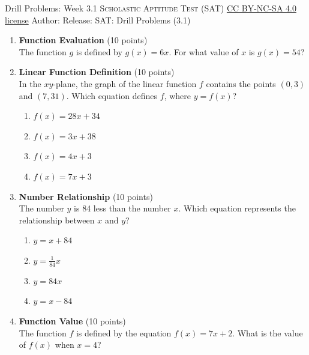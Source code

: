 \newpage\handout
{Drill Problems: Week 3.1}
{\textsc{Scholastic Aptitude Test (SAT)}}
{\href{https://creativecommons.org/licenses/by-nc-sa/4.0/}{CC BY-NC-SA 4.0 license}}
{Author: \BookAuthor}{Release: \generatedOn}
{SAT: Drill Problems (3.1)}


\begin{enumerate}
  \item \textbf{Function Evaluation} (10 points)\\
  The function $g$ is defined by $g(x)=6x$. For what value of $x$ is $g(x)=54$?
  \begin{subanswer}
  \end{subanswer}

  \item \textbf{Linear Function Definition} (10 points)\\
  In the $xy$-plane, the graph of the linear function $f$ contains the points $(0,3)$ and $(7,31)$. Which equation defines $f$, where $y=f(x)$?\\
  \begin{enumerate}[label=(\Alph*)]
    \item $f(x)=28x+34$
    \item $f(x)=3x+38$
    \item $f(x)=4x+3$
    \item $f(x)=7x+3$
  \end{enumerate}
  \begin{subanswer}
  \end{subanswer}

  \item \textbf{Number Relationship} (10 points)\\
  The number $y$ is 84 less than the number $x$. Which equation represents the relationship between $x$ and $y$?\\
  \begin{enumerate}[label=(\Alph*)]
    \item $y=x+84$
    \item $y=\frac{1}{84}x$
    \item $y=84x$
    \item $y=x-84$
  \end{enumerate}
  \begin{subanswer}
  \end{subanswer}

  \item \textbf{Function Value} (10 points)\\
  The function $f$ is defined by the equation $f(x)=7x+2$. What is the value of $f(x)$ when $x=4$?
  \begin{subanswer}
  \end{subanswer}




\end{enumerate}
